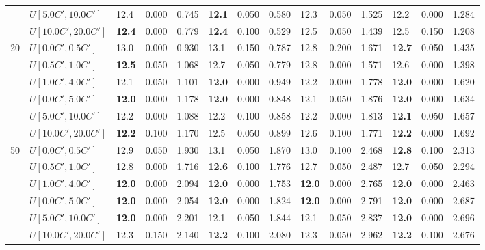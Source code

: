 \begin{table}[h]
{\begin{tabular}{|l|l||l|l|l||l|l|l||l|l|l||l|l|l|}
       & $U[5.0C',10.0C']$ & 12.4 & 0.000 & 0.745 & \textbf{12.1} & 0.050 & 0.580 & 12.3 & 0.050 & 1.525 & 12.2 & 0.000 & 1.284 \\
       & $U[10.0C',20.0C']$ & \textbf{12.4} & 0.000 & 0.779 & \textbf{12.4} & 0.100 & 0.529 & 12.5 & 0.050 & 1.439 & 12.5 & 0.150 & 1.208 \\
      \hline\hline
      \multirow{6}{*}{20} & $U[0.0C',0.5C']$ & 13.0 & 0.000 & 0.930 & 13.1 & 0.150 & 0.787 & 12.8 & 0.200 & 1.671 & \textbf{12.7} & 0.050 & 1.435 \\
       & $U[0.5C',1.0C']$ & \textbf{12.5} & 0.050 & 1.068 & 12.7 & 0.050 & 0.779 & 12.8 & 0.000 & 1.571 & 12.6 & 0.000 & 1.398 \\
       & $U[1.0C',4.0C']$ & 12.1 & 0.050 & 1.101 & \textbf{12.0} & 0.000 & 0.949 & 12.2 & 0.000 & 1.778 & \textbf{12.0} & 0.000 & 1.620 \\
       & $U[0.0C',5.0C']$ & \textbf{12.0} & 0.000 & 1.178 & \textbf{12.0} & 0.000 & 0.848 & 12.1 & 0.050 & 1.876 & \textbf{12.0} & 0.000 & 1.634 \\
       & $U[5.0C',10.0C']$ & 12.2 & 0.000 & 1.088 & 12.2 & 0.100 & 0.858 & 12.2 & 0.000 & 1.813 & \textbf{12.1} & 0.050 & 1.657 \\
       & $U[10.0C',20.0C']$ & \textbf{12.2} & 0.100 & 1.170 & 12.5 & 0.050 & 0.899 & 12.6 & 0.100 & 1.771 & \textbf{12.2} & 0.000 & 1.692 \\
      \hline\hline
      \multirow{6}{*}{50} & $U[0.0C',0.5C']$ & 12.9 & 0.050 & 1.930 & 13.1 & 0.050 & 1.870 & 13.0 & 0.100 & 2.468 & \textbf{12.8} & 0.100 & 2.313 \\
       & $U[0.5C',1.0C']$ & 12.8 & 0.000 & 1.716 & \textbf{12.6} & 0.100 & 1.776 & 12.7 & 0.050 & 2.487 & 12.7 & 0.050 & 2.294 \\
       & $U[1.0C',4.0C']$ & \textbf{12.0} & 0.000 & 2.094 & \textbf{12.0} & 0.000 & 1.753 & \textbf{12.0} & 0.000 & 2.765 & \textbf{12.0} & 0.000 & 2.463 \\
       & $U[0.0C',5.0C']$ & \textbf{12.0} & 0.000 & 2.054 & \textbf{12.0} & 0.000 & 1.824 & \textbf{12.0} & 0.000 & 2.791 & \textbf{12.0} & 0.000 & 2.687 \\
       & $U[5.0C',10.0C']$ & \textbf{12.0} & 0.000 & 2.201 & 12.1 & 0.050 & 1.844 & 12.1 & 0.050 & 2.837 & \textbf{12.0} & 0.000 & 2.696 \\
       & $U[10.0C',20.0C']$ & 12.3 & 0.150 & 2.140 & \textbf{12.2} & 0.100 & 2.080 & 12.3 & 0.050 & 2.962 & \textbf{12.2} & 0.100 & 2.676 \\
      \hline
      \end{tabular}
      }
      \label{tab:pcpn90p8ILPVariant}\end{table}
      
